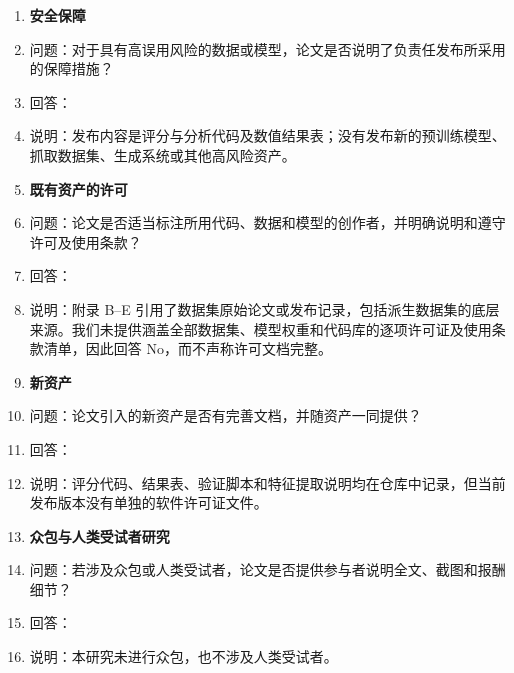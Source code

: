 \begin{enumerate}
\item \textbf{安全保障}
\item[] 问题：对于具有高误用风险的数据或模型，论文是否说明了负责任发布所采用的保障措施？
\item[] 回答：\answerNA{}
\item[] 说明：发布内容是评分与分析代码及数值结果表；没有发布新的预训练模型、抓取数据集、生成系统或其他高风险资产。

\item \textbf{既有资产的许可}
\item[] 问题：论文是否适当标注所用代码、数据和模型的创作者，并明确说明和遵守许可及使用条款？
\item[] 回答：\answerNo{}
\item[] 说明：附录 B--E 引用了数据集原始论文或发布记录，包括派生数据集的底层来源。我们未提供涵盖全部数据集、模型权重和代码库的逐项许可证及使用条款清单，因此回答 No，而不声称许可文档完整。

\item \textbf{新资产}
\item[] 问题：论文引入的新资产是否有完善文档，并随资产一同提供？
\item[] 回答：\answerNo{}
\item[] 说明：评分代码、结果表、验证脚本和特征提取说明均在仓库中记录，但当前发布版本没有单独的软件许可证文件。

\item \textbf{众包与人类受试者研究}
\item[] 问题：若涉及众包或人类受试者，论文是否提供参与者说明全文、截图和报酬细节？
\item[] 回答：\answerNA{}
\item[] 说明：本研究未进行众包，也不涉及人类受试者。


\end{enumerate}
